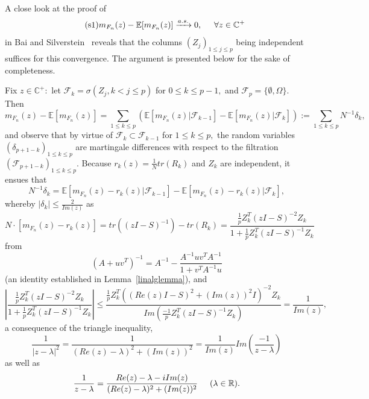 \documentclass{article}
\numberwithin{equation}{section}
\begin{document}
A close look at the proof of %
\begin{equation}\tag{s1}\label{as}
    m_{F_n}(z)-\mathbb{E}[m_{F_n}(z)] \xrightarrow[]{a.s.} 0, \hspace{0.5cm} \forall z \in \mathbb{C}^{+}
\end{equation}
in Bai and Silverstein~\cite{baisilvbook} reveals that the columns \((Z_j)_{1 \leq j \leq p}\) being independent suffices for this convergence. The argument is presented below for the sake of completeness.
\par
Fix \(z \in \mathbb{C}^+:\) let \(\mathcal{F}_{k}=\sigma(Z_j,k<j\leq p)\) for \(0 \leq k \leq p-1,\) and \(\mathcal{F}_p=\{\emptyset,\Omega\}.\) Then
\begin{equation}\label{mgdiff}
    m_{F_n}(z)-\mathbb{E}[m_{F_n}(z)]=\sum_{1 \leq k \leq p}{(\mathbb{E}[m_{F_n}(z)|\mathcal{F}_{k-1}]-\mathbb{E}[m_{F_n}(z)|\mathcal{F}_k])}:=\sum_{1 \leq k \leq p}{N^{-1}\delta_k},
\end{equation}
and observe that by virtue of \(\mathcal{F}_{k} \subset \mathcal{F}_{k-1}\) for \(1 \leq k \leq p,\) the random variables \((\delta_{p+1-k})_{1 \leq k \leq p}\) are martingale differences with respect to the filtration \((\mathcal{F}_{p+1-k})_{1 \leq k \leq p}.\) Because \(r_k(z)=\frac{1}{N}tr(R_k)\) and \(Z_k\) are independent, it ensues that
\[N^{-1}\delta_k=\mathbb{E}[m_{F_n}(z)-r_k(z)|\mathcal{F}_{k-1}]-\mathbb{E}[m_{F_n}(z)-r_k(z)|\mathcal{F}_k],\]
whereby \(|\delta_k| \leq \frac{2}{Im(z)}\) as
\begin{equation}\label{res1}
    N \cdot [m_{F_n}(z)-r_k(z)]=tr((zI-S)^{-1})-tr(R_k)=\frac{\frac{1}{p}Z_k^T(zI-S)^{-2}Z_k}{1+\frac{1}{p}Z_k^T(zI-S)^{-1}Z_k}
\end{equation}
from
\[(A+uv^T)^{-1}=A^{-1}-\frac{A^{-1}uv^TA^{-1}}{1+v^TA^{-1}u}\]
(an identity established in Lemma~\ref{linalglemma}), and
\begin{equation}\label{res2}
    |\frac{\frac{1}{p}Z_k^T(zI-S)^{-2}Z_k}{1+\frac{1}{p}Z_k^T(zI-S)^{-1}Z_k}| \leq \frac{\frac{1}{p}Z_k^T((Re(z)I-S)^2+(Im(z))^2I)^{-2}Z_k}{Im(\frac{-1}{p}Z_k^T(zI-S)^{-1}Z_k)}=\frac{1}{Im(z)},
\end{equation}
a consequence of the triangle inequality,
\[\frac{1}{|z-\lambda|^2}=\frac{1}{(Re(z)-\lambda)^2+(Im(z))^2}=\frac{1}{Im(z)}Im(\frac{-1}{z-\lambda})\] 
as well as
\[\frac{1}{z-\lambda}=\frac{Re(z)-\lambda-iIm(z)}{(Re(z)-\lambda)^2+(Im(z))^2} \hspace{0.5cm} (\lambda \in \mathbb{R}).\]
\end{document}
